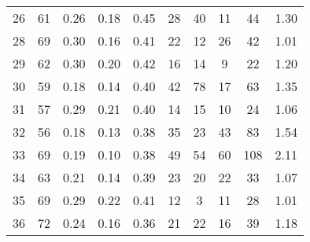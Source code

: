 \documentclass[usenatbib]{mn2e}
\begin{document}
{\begin{table*}
\begin{center}
\begin{tabular}{lccccccccc}
26 &       61 &                             0.26 &                             0.18 &                             0.45 &              28 &              40 &                                 11 &                              44 &       1.30 \\
28 &       69 &                             0.30 &                             0.16 &                             0.41 &              22 &              12 &                                 26 &                              42 &       1.01 \\
29 &       62 &                             0.30 &                             0.20 &                             0.42 &              16 &              14 &                                  9 &                              22 &       1.20 \\
30 &       59 &                             0.18 &                             0.14 &                             0.40 &              42 &              78 &                                 17 &                              63 &       1.35 \\
31 &       57 &                             0.29 &                             0.21 &                             0.40 &              14 &              15 &                                 10 &                              24 &       1.06 \\
32 &       56 &                             0.18 &                             0.13 &                             0.38 &              35 &              23 &                                 43 &                              83 &       1.54 \\
33 &       69 &                             0.19 &                             0.10 &                             0.38 &              49 &              54 &                                 60 &                             108 &       2.11 \\
34 &       63 &                             0.21 &                             0.14 &                             0.39 &              23 &              20 &                                 22 &                              33 &       1.07 \\
35 &       69 &                             0.29 &                             0.22 &                             0.41 &              12 &               3 &                                 11 &                              28 &       1.01 \\
36 &       72 &                             0.24 &                             0.16 &                             0.36 &              21 &              22 &                                 16 &                              39 &       1.18 \\

\end{tabular}
\end{center}
\end{table*}}
\end{document}
